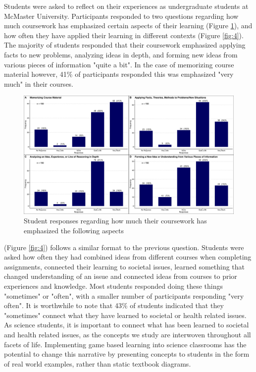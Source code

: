 \documentclass[10pt]{article}
\providecommand{\figref}[1]{(Figure \ref{#1})}  %
\begin{document}
Students were asked to reflect on their experiences as undergraduate students at McMaster University. Participants responded to two questions regarding how much coursework has emphasized certain aspects of their learning \figref{fig:3}, and how often they have applied their learning in different contexts \figref{fig:4}. The majority of students responded that their coursework emphasized applying facts to new problems, analyzing ideas in depth, and forming new ideas from various pieces of information "quite a bit". In the case of memorizing course material however, 41\% of participants responded this was emphasized "very much" in their courses. 

\begin{figure}[H]
	\includegraphics[width=\textwidth]{figures_4f06/howmuch_coursework_emphasized_thefollowing.jpg}
	\caption{Student responses regarding how much their coursework has emphasized the following aspects}
	\label{fig:3}
\end{figure}

\figref{fig:4} follows a similar format to the previous question. Students were asked how often they had combined ideas from different courses when completing assignments, connected their learning to societal issues, learned something that changed understanding of an issue and connected ideas from courses to prior experiences and knowledge. Most students responded doing these things "sometimes" or "often", with a smaller number of participants responding "very often". It is worthwhile to note that 43\% of students indicated that they "sometimes" connect what they have learned to societal or health related issues. As science students, it is important to connect what has been learned to societal and health related issues, as the concepts we study are interwoven throughout all facets of life. Implementing game based learning into science classrooms has the potential to change this narrative by presenting concepts to students in the form of real world examples, rather than static textbook diagrams.
\end{document}
